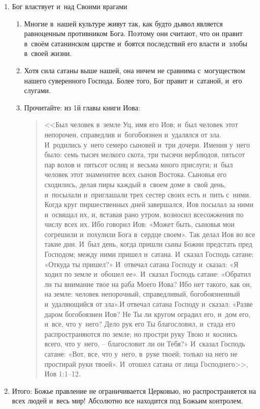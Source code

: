 \documentclass[a4paper,12pt]{article}
\begin{document}
\begin{enumerate}
\begin{itemize}
\begin{enumerate}
        \item Бог властвует и~над Своими врагами
        \begin{enumerate}
            \item Многие в~нашей культуре живут так, как будто дьявол является равноценным противником Бога. Поэтому они считают, что он правит в~своём сатанинском царстве и~боятся последствий его власти и~злобы в~своей жизни. 
            \item Хотя сила сатаны выше нашей, она ничем не сравнима с~могуществом нашего суверенного Господа. Более того, Бог правит и~сатаной, и~его слугами. 
            \item Прочитайте: из 1й главы книги Иова: 
            \begin{quote}
            <<Был человек в~земле Уц, имя его Иов; и~был человек этот непорочен, справедлив и~богобоязнен и~удалялся от зла. И~родились у~него семеро сыновей и~три дочери. Имения у~него было: семь тысяч мелкого скота, три тысячи верблюдов, пятьсот пар волов и~пятьсот ослиц и~весьма много прислуги; и~был человек этот знаменитее всех сынов Востока. Сыновья его сходились, делая пиры каждый в~своем доме в~свой день, и~посылали и~приглашали трех сестер своих есть и~пить с~ними. Когда круг пиршественных дней завершался, Иов посылал за ними и~освящал их, и, вставая рано утром, возносил всесожжения по числу всех их. Ибо говорил Иов: «Может быть, сыновья мои согрешили и~похулили Бога в~сердце своем». Так делал Иов во все такие дни. И~был день, когда пришли сыны Божии предстать пред Господом; между ними пришел и~сатана. И~сказал Господь сатане: «Откуда ты пришел?» И~отвечал сатана Господу и~сказал: «Я ходил по земле и~обошел ее». И~сказал Господь сатане: «Обратил ли ты внимание твое на раба Моего Иова? Ибо нет такого, как он, на земле: человек непорочный, справедливый, богобоязненный и~удаляющийся от зла».И отвечал сатана Господу и~сказал: «Разве даром богобоязнен Иов? Не Ты ли кругом оградил его, и~дом его, и~все, что у~него? Дело рук его Ты благословил, и~стада его распространяются по земле; но простри руку Твою и~коснись всего, что у~него, – благословит ли он Тебя?» И~сказал Господь сатане: «Вот, все, что у~него, в~руке твоей; только на него не простирай руки твоей». И~отошел сатана от лица Господнего>>, Иов 1:1--12.
            \end{quote}
        \end{enumerate}
        \item Итого: Божье правление не ограничивается Церковью, но распространяется на всех людей и~весь мир! Абсолютно все находится под Божьим контролем.

\end{enumerate}
\end{itemize}
\end{enumerate}
\end{document}

